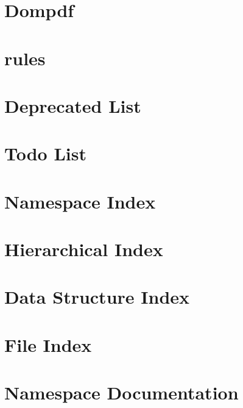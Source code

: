 \let\mypdfximage\pdfximage\def\pdfximage{\immediate\mypdfximage}\documentclass[twoside]{book}
\newcommand{\+}{\discretionary{\mbox{\scriptsize$\hookleftarrow$}}{}{}}
\begin{document}
\chapter{Dompdf}
\label{md_php_dompdf__r_e_a_d_m_e}

\chapter{rules}
\label{rules}

\chapter{Deprecated List}
\label{deprecated}

\chapter{Todo List}
\label{todo}

\chapter{Namespace Index}

\chapter{Hierarchical Index}

\chapter{Data Structure Index}

\chapter{File Index}

\chapter{Namespace Documentation}





































\end{document}
